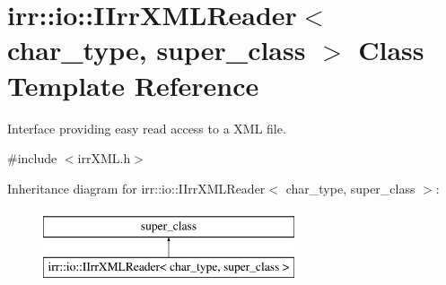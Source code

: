 \hypertarget{classirr_1_1io_1_1IIrrXMLReader}{}\section{irr\+:\+:io\+:\+:I\+Irr\+X\+M\+L\+Reader$<$ char\+\_\+type, super\+\_\+class $>$ Class Template Reference}
\label{classirr_1_1io_1_1IIrrXMLReader}


Interface providing easy read access to a X\+ML file.  




{\ttfamily \#include $<$irr\+X\+M\+L.\+h$>$}

Inheritance diagram for irr\+:\+:io\+:\+:I\+Irr\+X\+M\+L\+Reader$<$ char\+\_\+type, super\+\_\+class $>$\+:\begin{figure}[H]
\begin{center}
\leavevmode
\includegraphics[height=2.000000cm]{classirr_1_1io_1_1IIrrXMLReader}
\end{center}
\end{figure}

